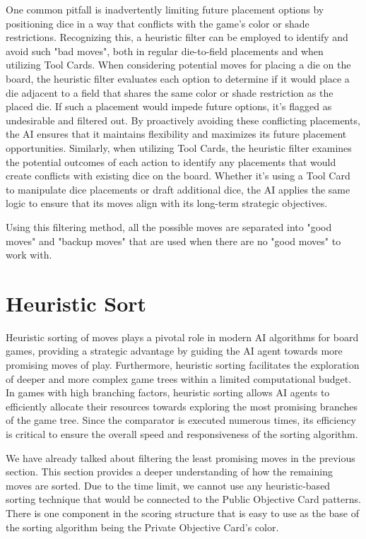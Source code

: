 One common pitfall is inadvertently limiting future placement options by positioning dice in a way that conflicts with the game's color or shade restrictions. 
Recognizing this, a heuristic filter can be employed to identify and avoid such "bad moves", both in regular die-to-field placements and when utilizing Tool Cards.
When considering potential moves for placing a die on the board, the heuristic filter evaluates each option to determine if it would place a die adjacent to a field 
that shares the same color or shade restriction as the placed die. If such a placement would impede future options, it's flagged as undesirable and filtered out. 
By proactively avoiding these conflicting placements, the AI ensures that it maintains flexibility and maximizes its future placement opportunities.
Similarly, when utilizing Tool Cards, the heuristic filter examines the potential outcomes of each action to identify any placements that would create conflicts with 
existing dice on the board. Whether it's using a Tool Card to manipulate dice placements or draft additional dice, the AI applies the same logic to ensure that its 
moves align with its long-term strategic objectives.

Using this filtering method, all the possible moves are separated into "good moves" and "backup moves" that are used when there are no "good moves" to work with.

\section{Heuristic Sort} \label{sec:Heuristic_sort}

Heuristic sorting of moves plays a pivotal role in modern AI algorithms for board games, providing a strategic advantage by guiding the AI agent towards more promising moves of play. 
Furthermore, heuristic sorting facilitates the exploration of deeper and more complex game trees within a limited computational budget. In games with high branching factors, 
heuristic sorting allows AI agents to efficiently allocate their resources towards exploring the most promising branches of the game tree. Since the comparator is executed numerous times, 
its efficiency is critical to ensure the overall speed and responsiveness of the sorting algorithm.

We have already talked about filtering the least promising moves in the previous section. This section provides a deeper understanding of how the remaining moves are sorted.
Due to the time limit, we cannot use any heuristic-based sorting technique that would be connected to the Public Objective Card patterns. There is one component in the scoring
structure that is easy to use as the base of the sorting algorithm being the Private Objective Card's color.

